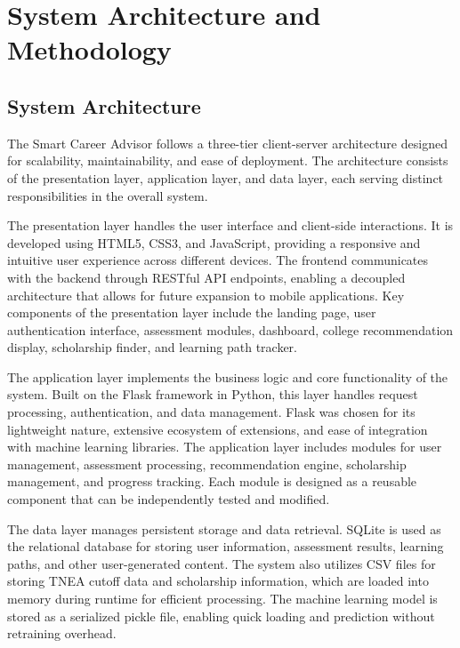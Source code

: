 \documentclass[journal]{IEEEtran}
\begin{document}
\section{System Architecture and Methodology}

\subsection{System Architecture}
The Smart Career Advisor follows a three-tier client-server architecture designed for scalability, maintainability, and ease of deployment. The architecture consists of the presentation layer, application layer, and data layer, each serving distinct responsibilities in the overall system.

The presentation layer handles the user interface and client-side interactions. It is developed using HTML5, CSS3, and JavaScript, providing a responsive and intuitive user experience across different devices. The frontend communicates with the backend through RESTful API endpoints, enabling a decoupled architecture that allows for future expansion to mobile applications. Key components of the presentation layer include the landing page, user authentication interface, assessment modules, dashboard, college recommendation display, scholarship finder, and learning path tracker.

The application layer implements the business logic and core functionality of the system. Built on the Flask framework in Python, this layer handles request processing, authentication, and data management. Flask was chosen for its lightweight nature, extensive ecosystem of extensions, and ease of integration with machine learning libraries. The application layer includes modules for user management, assessment processing, recommendation engine, scholarship management, and progress tracking. Each module is designed as a reusable component that can be independently tested and modified.

The data layer manages persistent storage and data retrieval. SQLite is used as the relational database for storing user information, assessment results, learning paths, and other user-generated content. The system also utilizes CSV files for storing TNEA cutoff data and scholarship information, which are loaded into memory during runtime for efficient processing. The machine learning model is stored as a serialized pickle file, enabling quick loading and prediction without retraining overhead.
\end{document}

